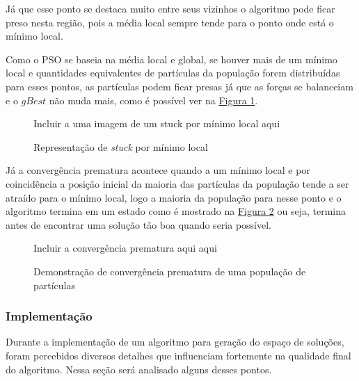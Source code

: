             Já que esse ponto se destaca muito entre seus vizinhos o algoritmo pode ficar preso nesta região, pois a média local sempre tende para o ponto onde está o mínimo local.\newline

            Como o PSO se baseia na média local e global, se houver mais de um mínimo local e quantidades equivalentes de partículas da população forem distribuídas para esses pontos, as partículas podem ficar presas já que as forças se balanceiam e o $gBest$ não muda mais, como é possível ver na \hyperref[fig:stuck-por-minimolocal]{Figura \ref{fig:stuck-por-minimolocal}}.\newline
            
            \begin{figure}[h]
                \centering
                \small{Incluir a uma imagem de um stuck por mínimo local aqui}
                \caption{Representação de \textit{stuck} por mínimo local}
                \label{fig:stuck-por-minimolocal}
            \end{figure}
            
            
            Já a convergência prematura acontece quando a um mínimo local e por coincidência a posição inicial da maioria das partículas da população tende a ser atraído para o mínimo local, logo a maioria da população para nesse ponto e o algoritmo termina em um estado como é mostrado na 
            \hyperref[fig:convergencia-prematura]{Figura \ref{fig:convergencia-prematura}} 
            ou seja, termina antes de encontrar uma solução tão boa quando seria possível.\newline

            \begin{figure}[h]
                \centering
                \small{Incluir a convergência prematura aqui aqui}
                \caption{Demonstração de convergência prematura de uma população de partículas}
                \label{fig:convergencia-prematura}
            \end{figure}
            
        

        \subsubsection{Implementação}
            Durante a implementação de um algoritmo para geração do espaço de soluções, foram percebidos diversos detalhes que influenciam fortemente na qualidade final do algoritmo. Nessa seção será analisado alguns desses pontos.

